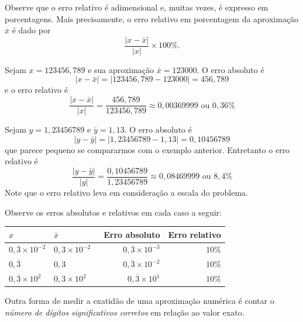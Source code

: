\begin{obs}
  Observe que o erro relativo é adimensional e, muitas vezes, é expresso em porcentagens. Mais precisamente, o erro relativo em porcentagem da aproximação $\overline{x}$ é dado por
  \begin{equation*}
    \frac{|x-\bar{x}|}{|x|}\times 100 \%.
  \end{equation*}
\end{obs}

\begin{ex}
Sejam $x=123456,789$ e sua aproximação $\bar{x}=123000$. O erro absoluto é
$$
|x-\bar{x}|=|123456,789-123000|=456,789
$$
e o erro relativo é
$$
\frac{|x-\bar{x}|}{|x|}=\frac{456,789}{123456,789}\approx 0,00369999 \text{ ou }0,36\%
$$
\end{ex}

\begin{ex}
Sejam $y=1,23456789$ e $\bar{y}=1,13$. O erro absoluto é
$$
|y-\bar{y}|=|1,23456789-1,13|=0,10456789
$$
que parece pequeno se compararmos com o exemplo anterior. Entretanto o erro relativo é
$$
\frac{|y-\bar{y}|}{|y|}=\frac{0,10456789}{1,23456789}\approx 0,08469999 \text{ ou }8,4\%
$$
Note que o erro relativo leva em consideração a escala do problema.
\end{ex}



\begin{ex}
Observe os erros absolutos e relativos em cada caso a seguir:
\begin{center}
  \begin{tabular}{ll|rr} \hline
    $x$ & $\bar{x}$ &\ Erro absoluto & Erro relativo\\\hline
    $0,\overline{3}\times 10^{-2}$ & $0,3\times 10^{-2}$ & $0,\overline{3}\times 10^{-3}$ & $10\%$\\ 
    $0,\overline{3}$              & $0,3$ & $0,\overline{3}\times 10^{-2}$ & $10\%$\\ 
    $0,\overline{3}\times 10^{2}$ & $0,3\times 10^{2}$ & $0,\overline{3}\times 10^{1}$ & $10\%$\\\hline
\end{tabular}  
\end{center}
\end{ex}

Outra forma de medir a exatidão de uma aproximação numérica é contar o \emph{número de dígitos significativos corretos} em relação ao valor exato.


